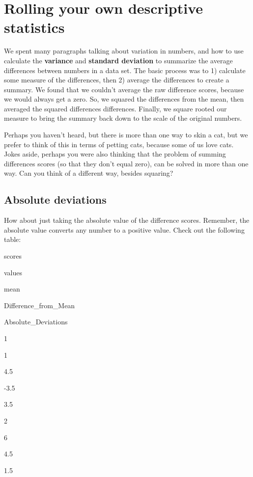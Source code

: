 \documentclass[]{book}
\begin{document}
\hypertarget{rolling-your-own-descriptive-statistics}{%
\section{Rolling your own descriptive statistics}\label{rolling-your-own-descriptive-statistics}}

We spent many paragraphs talking about variation in numbers, and how to use calculate the \textbf{variance} and \textbf{standard deviation} to summarize the average differences between numbers in a data set. The basic process was to 1) calculate some measure of the differences, then 2) average the differences to create a summary. We found that we couldn't average the raw difference scores, because we would always get a zero. So, we squared the differences from the mean, then averaged the squared differences differences. Finally, we square rooted our measure to bring the summary back down to the scale of the original numbers.

Perhaps you haven't heard, but there is more than one way to skin a cat, but we prefer to think of this in terms of petting cats, because some of us love cats. Jokes aside, perhaps you were also thinking that the problem of summing differences scores (so that they don't equal zero), can be solved in more than one way. Can you think of a different way, besides squaring?

\hypertarget{absolute-deviations}{%
\subsection{Absolute deviations}\label{absolute-deviations}}

How about just taking the absolute value of the difference scores. Remember, the absolute value converts any number to a positive value. Check out the following table:

scores

values

mean

Difference\_from\_Mean

Absolute\_Deviations

1

1

4.5

-3.5

3.5

2

6

4.5

1.5
\end{document}
